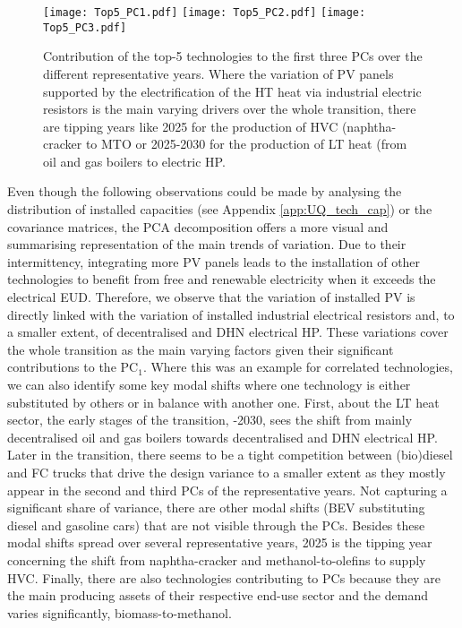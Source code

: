\begin{figure}[!htbp]
\centering
\texttt{[image: Top5\_PC1.pdf]}
\texttt{[image: Top5\_PC2.pdf]}
\texttt{[image: Top5\_PC3.pdf]}
\caption{Contribution of the top-5 technologies to the first three \gls{PCs} over the different representative years. Where the variation of \gls{PV} panels supported by the electrification of the \gls{HT} heat via industrial electric resistors is the main varying drivers over the whole transition, there are tipping years like 2025 for the production of \gls{HVC} (\ie naphtha-cracker to \gls{MTO} or 2025-2030 for the production of \gls{LT} heat (\ie from oil and gas boilers to electric \gls{HP}.}
\label{fig:Top5_PC_year}
\end{figure}

Even though the following observations could be made by analysing the distribution of installed capacities (see Appendix \ref{app:UQ_tech_cap}) or the covariance matrices, the \gls{PCA} decomposition offers a more visual and summarising representation of the main trends of variation. Due to their intermittency, integrating more \gls{PV} panels leads to the installation of other technologies to benefit from free and renewable electricity when it exceeds the electrical \gls{EUD}. Therefore, we observe that the variation of installed \gls{PV} is directly linked with the variation of installed industrial electrical resistors and, to a smaller extent, of decentralised and \gls{DHN} electrical \gls{HP}. These variations cover the whole transition as the main varying factors given their significant contributions to the $\text{PC}_{1}$. Where this was an example for correlated technologies, we can also identify some key modal shifts where one technology is either substituted by others or in balance with another one. First, about the \gls{LT} heat sector, the early stages of the transition, -2030, sees the shift from mainly decentralised oil and gas boilers towards decentralised and \gls{DHN} electrical \gls{HP}. Later in the transition, there seems to be a tight competition between (bio)diesel and \gls{FC} trucks that drive the design variance to a smaller extent as they mostly appear in the second and third \gls{PCs} of the representative years. Not capturing a significant share of variance, there are other modal shifts (\eg \gls{BEV} substituting diesel and gasoline cars) that are not visible through the \gls{PCs}. Besides these modal shifts spread over several representative years, 2025 is the tipping year concerning the shift from naphtha-cracker and methanol-to-olefins to supply \gls{HVC}. Finally, there are also technologies contributing to \gls{PCs} because they are the main producing assets of their respective end-use sector and the demand varies significantly, \eg biomass-to-methanol.

